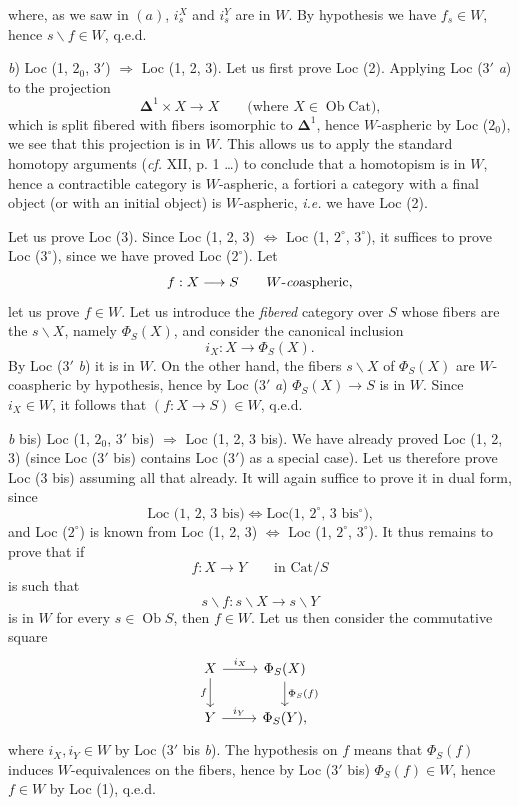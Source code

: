 \setcounter{footnote}{2}

where, as we saw in $(a)$, $i_s^X$ and $i_s^Y$ are in $W$. By hypothesis we have $f_s \in W$, hence $s\backslash f \in W$, q.e.d.

\textit{b}) Loc (1, $2_0$, $3'$) $\Longrightarrow$ Loc (1, 2, 3). Let us first prove Loc (2). Applying Loc ($3'$ \textit{a}) to the projection
\[
\boldsymbol{\Delta}^1 \times X \longrightarrow X \qquad \text{(where $X \in \operatorname{Ob}\mathrm{Cat}$),}
\]
which is split fibered with fibers isomorphic to $\boldsymbol{\Delta}^1$, hence $W$-aspheric by Loc ($2_0$), we see that this projection is in $W$. This allows us to apply the standard homotopy arguments (\textit{cf.} XII, p. 1 \ldots) to conclude that a homotopism is in $W$, hence a contractible category is $W$-aspheric, a fortiori a category with a final object (or with an initial object) is $W$-aspheric, \textit{i.e.} we have Loc (2).

Let us prove Loc (3). Since Loc (1, 2, 3) $\Longleftrightarrow$ Loc (1, $2^\circ$, $3^\circ$), it suffices to prove Loc ($3^\circ$), since we have proved Loc ($2^\circ$). Let
\[
f : X \longrightarrow S \qquad \text{$W$-\textit{co}aspheric,}
\]
let us prove $f \in W$. Let us introduce the \textit{fibered} category over $S$ whose fibers are the $s\backslash X$, namely $\Phi_S(X)$, and consider the canonical inclusion
\[
i_X : X \longrightarrow \Phi_S(X).
\]
By Loc ($3'$ \textit{b}) it is in $W$. On the other hand, the fibers $s\backslash X$ of $\Phi_S(X)$ are $W$-coaspheric by hypothesis, hence by Loc ($3'$ \textit{a}) $\Phi_S(X) \longrightarrow S$ is in $W$. Since $i_X \in W$, it follows that $(f : X \longrightarrow S) \in W$, q.e.d.

\textit{b} bis) Loc (1, $2_0$, $3'$ bis) $\Longrightarrow$ Loc (1, 2, 3 bis). We have already proved Loc (1, 2, 3) (since Loc ($3'$ bis) contains Loc ($3'$) as a special case). Let us therefore prove Loc (3 bis) assuming all that already. It will again suffice to prove it in dual form, since
\[
\text{Loc (1, 2, 3 bis)} \iff \text{Loc(1, $2^\circ$, 3 bis$^\circ$),}
\]
and Loc ($2^\circ$) is known from Loc (1, 2, 3) $\Longleftrightarrow$ Loc (1, $2^\circ$, $3^\circ$). It thus remains to prove that if
\[
f : X \longrightarrow Y \qquad \text{in } \mathrm{Cat}/S
\]
is such that
\[
s\backslash f : s\backslash X \longrightarrow s\backslash Y
\]
is in $W$ for every $s \in \operatorname{Ob} S$, then $f \in W$. Let us then consider the commutative square
\[
\begin{tikzcd}
X \arrow[r, "i_X"] \arrow[d, "f"'] & \Phi_S(X) \arrow[d, "\Phi_S(f)"] \\
Y \arrow[r, "i_Y"] & \Phi_S(Y),
\end{tikzcd}
\]
where $i_X, i_Y \in W$ by Loc ($3'$ bis \textit{b}). The hypothesis on $f$ means that $\Phi_S(f)$ induces $W$-equivalences on the fibers, hence by Loc ($3'$ bis) $\Phi_S(f) \in W$, hence $f \in W$ by Loc (1), q.e.d.

